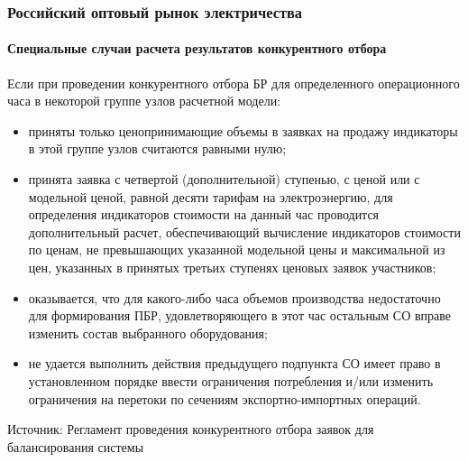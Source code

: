 \documentclass[c, dvipsnames]{beamer}  %
\begin{document}
\begin{frame}[shrink=5]
\frametitle{Российский оптовый рынок электричества} 
\framesubtitle{Специальные случаи расчета результатов конкурентного отбора} 

Если при проведении конкурентного отбора БР для определенного операционного часа в некоторой группе узлов расчетной модели:

\begin{itemize}
\item  приняты только ценопринимающие объемы в заявках на продажу индикаторы в этой группе узлов считаются равными нулю;
\item принята заявка с четвертой (дополнительной) ступенью, с ценой или с модельной ценой, равной десяти тарифам на электроэнергию, для определения индикаторов стоимости на данный час проводится дополнительный расчет, обеспечивающий вычисление индикаторов стоимости по ценам, не превышающих указанной модельной цены и максимальной из цен, указанных в принятых третьих ступенях ценовых заявок участников;
\item  оказывается, что для какого-либо часа объемов производства недостаточно для формирования ПБР, удовлетворяющего в этот час остальным СО вправе изменить состав выбранного оборудования;
\item 	 не удается выполнить действия предыдущего подпункта  СО имеет право в установленном порядке ввести ограничения потребления и/или изменить ограничения на перетоки по сечениям экспортно-импортных операций.
\end{itemize}

Источник:
Регламент проведения конкурентного  отбора заявок для балансирования системы



\end{frame}
\end{document}
